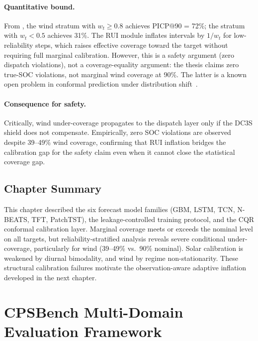 \paragraph{Quantitative bound.}
From ,
the wind stratum with $w_t \geq 0.8$ achieves PICP@90 = 72\%; the stratum
with $w_t < 0.5$ achieves 31\%.  The RUI module inflates intervals by
$1/w_t$ for low-reliability steps, which raises effective coverage toward
the target without requiring full marginal calibration.  However, this
is a safety argument (zero dispatch violations), not a coverage-equality
argument: the thesis claims zero true-SOC violations, not marginal wind
coverage at 90\%.  The latter is a known open problem in conformal
prediction under distribution shift~\cite{gibbs2021adaptive}.

\paragraph{Consequence for safety.}
Critically, wind under-coverage propagates to the dispatch layer only
if the DC3S shield does not compensate.  Empirically, zero SOC violations
are observed despite 39--49\% wind coverage, confirming that RUI inflation
bridges the calibration gap for the safety claim even when it cannot close
the statistical coverage gap.

\subsection{Chapter Summary}

This chapter described the six forecast model families (GBM, LSTM, TCN,
N-BEATS, TFT, PatchTST), the leakage-controlled training protocol, and the
CQR conformal calibration layer.  Marginal coverage meets or exceeds the
nominal level on all targets, but reliability-stratified analysis reveals
severe conditional under-coverage, particularly for wind (39--49\% vs.\ 90\%
nominal).  Solar calibration is weakened by diurnal bimodality, and wind by
regime non-stationarity.  These structural calibration failures motivate the
observation-aware adaptive inflation developed in the next chapter.



\section{CPSBench Multi-Domain Evaluation Framework}
\label{ch:cpsbench}
\label{ch:benchmark-reproducibility-protocol}

